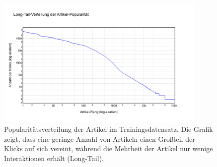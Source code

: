 
\begin{figure}[H]
    \centering
    \includegraphics[width=0.9\textwidth]{content/figures/svg/artikel_verteilung_train.pdf}
    \caption{Popularitätsverteilung der Artikel im Trainingsdatensatz. Die Grafik zeigt, dass eine geringe Anzahl von Artikeln einen Großteil der Klicks auf sich vereint, während die Mehrheit der Artikel nur wenige Interaktionen erhält (Long-Tail).}
    \label{fig:artikelverteilung_train}
\end{figure}